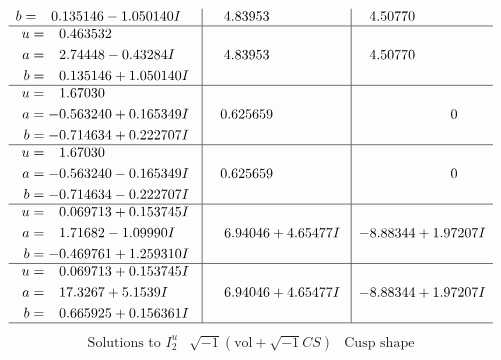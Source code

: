 \documentclass[1p]{elsarticle_modified}
\theoremstyle{definition}
\newcommand{\I}{\sqrt{-1}}
\begin{document}
$$\begin{array}{c|c|c}
\begin{aligned}
b &= \phantom{-}0.135146 - 1.050140 I\end{aligned}
 & \phantom{-}4.83953\phantom{ +0.000000I} & \phantom{-}4.50770\phantom{ +0.000000I} \\ \hline\begin{aligned}
u &= \phantom{-}0.463532\phantom{ +0.000000I} \\
a &= \phantom{-}2.74448 - 0.43284 I \\
b &= \phantom{-}0.135146 + 1.050140 I\end{aligned}
 & \phantom{-}4.83953\phantom{ +0.000000I} & \phantom{-}4.50770\phantom{ +0.000000I} \\ \hline\begin{aligned}
u &= \phantom{-}1.67030\phantom{ +0.000000I} \\
a &= -0.563240 + 0.165349 I \\
b &= -0.714634 + 0.222707 I\end{aligned}
 & \phantom{-}0.625659\phantom{ +0.000000I} & \phantom{-0.000000 } 0 \\ \hline\begin{aligned}
u &= \phantom{-}1.67030\phantom{ +0.000000I} \\
a &= -0.563240 - 0.165349 I \\
b &= -0.714634 - 0.222707 I\end{aligned}
 & \phantom{-}0.625659\phantom{ +0.000000I} & \phantom{-0.000000 } 0 \\ \hline\begin{aligned}
u &= \phantom{-}0.069713 + 0.153745 I \\
a &= \phantom{-}1.71682 - 1.09990 I \\
b &= -0.469761 + 1.259310 I\end{aligned}
 & \phantom{-}6.94046 + 4.65477 I & -8.88344 + 1.97207 I \\ \hline\begin{aligned}
u &= \phantom{-}0.069713 + 0.153745 I \\
a &= \phantom{-}17.3267 + 5.1539 I \\
b &= \phantom{-}0.665925 + 0.156361 I\end{aligned}
 & \phantom{-}6.94046 + 4.65477 I & -8.88344 + 1.97207 I\\
 \hline 
 \end{array}$$\newpage$$\begin{array}{c|c|c}  
\text{Solutions to }I^u_{2}& \I (\text{vol} + \sqrt{-1}CS) & \text{Cusp shape}\\
 \hline 
\begin{aligned}

\end{aligned}
\end{array}$$
\end{document}
